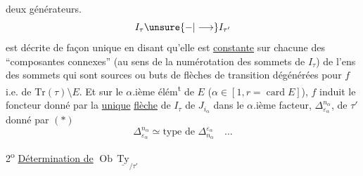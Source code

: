 deux générateurs. 
\[
 I_\tau\unsure{\mathbin{-}|\longrightarrow} I_{\tau'}
\]
est décrite de façon unique en disant qu'elle est \uline{constante}
sur chacune des ``composantes connexes'' (au sens de
la numérotation des sommets \unsure{\}|)} de $I_\tau$) de l'ens
des sommets qui sont sources ou buts de flèches
de transition dégénérées pour $f$ i.e. de $\mathrm{Tr}(\tau)\setminus E$.
Et sur le $\alpha$.ième élém\textsuperscript{t} de $E$ 
($\alpha\in[1,r=\operatorname{card} E]$), $f$ induit le foncteur
donné par la  \uline{unique} \uline{flèche} de $I_\tau$
de $J_{i_\alpha}$ dans le $\alpha$.ième facteur,  $\Delta_{\varepsilon_\alpha}^{n_\alpha}$, de $\tau'$\unsure{$*$|,}
donné par $(*)$
\[
 \Delta_{\varepsilon_\alpha}^{n_\alpha}\simeq\text{type de }\mathbb{\Delta}_{n_\alpha}^{\varepsilon_\alpha}\quad\ldots
\]

2\textsuperscript{o} \uline{Détermination de} $\operatorname{Ob}\,\underline{\mathrm{Ty}}_{/\tau'}$

